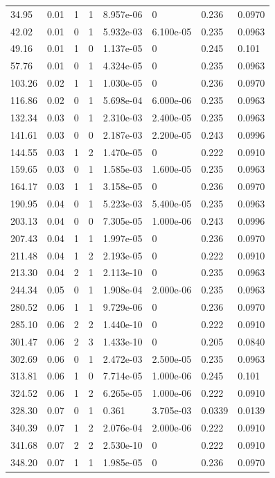 \documentclass[preview]{standalone}
\begin{document}
{{\begin{tabular}{L{1.2cm}C{1.2cm} C{0.3cm}C{0.5cm} C{1.4cm}C{1.4cm} C{1.4cm}C{1.4cm}}
  34.95  &  0.01  & 1     &  1 &  8.957e-06  & 0  & 0.236 &  0.0970   \\ 
  42.02  &  0.01  & 0     &  1 &  5.932e-03  & 6.100e-05  & 0.235 &  0.0963   \\ 
  49.16  &  0.01  & 1     &  0 &  1.137e-05  & 0  & 0.245 &  0.101   \\ 
  57.76  &  0.01  & 0     &  1 &  4.324e-05  & 0  & 0.235 &  0.0963   \\ 
  103.26  &  0.02  & 1     &  1 &  1.030e-05  & 0  & 0.236 &  0.0970   \\ 
  116.86  &  0.02  & 0     &  1 &  5.698e-04  & 6.000e-06  & 0.235 &  0.0963   \\ 
  132.34  &  0.03  & 0     &  1 &  2.310e-03  & 2.400e-05  & 0.235 &  0.0963   \\ 
  141.61  &  0.03  & 0     &  0 &  2.187e-03  & 2.200e-05  & 0.243 &  0.0996   \\ 
  144.55  &  0.03  & 1     &  2 &  1.470e-05  & 0  & 0.222 &  0.0910   \\ 
  159.65  &  0.03  & 0     &  1 &  1.585e-03  & 1.600e-05  & 0.235 &  0.0963   \\ 
  164.17  &  0.03  & 1     &  1 &  3.158e-05  & 0  & 0.236 &  0.0970   \\ 
  190.95  &  0.04  & 0     &  1 &  5.223e-03  & 5.400e-05  & 0.235 &  0.0963   \\ 
  203.13  &  0.04  & 0     &  0 &  7.305e-05  & 1.000e-06  & 0.243 &  0.0996   \\ 
  207.43  &  0.04  & 1     &  1 &  1.997e-05  & 0  & 0.236 &  0.0970   \\ 
  211.48  &  0.04  & 1     &  2 &  2.193e-05  & 0  & 0.222 &  0.0910   \\ 
  213.30  &  0.04  & 2     &  1 &  2.113e-10  & 0  & 0.235 &  0.0963   \\ 
  244.34  &  0.05  & 0     &  1 &  1.908e-04  & 2.000e-06  & 0.235 &  0.0963   \\ 
  280.52  &  0.06  & 1     &  1 &  9.729e-06  & 0  & 0.236 &  0.0970   \\ 
  285.10  &  0.06  & 2     &  2 &  1.440e-10  & 0  & 0.222 &  0.0910   \\ 
  301.47  &  0.06  & 2     &  3 &  1.433e-10  & 0  & 0.205 &  0.0840   \\ 
  302.69  &  0.06  & 0     &  1 &  2.472e-03  & 2.500e-05  & 0.235 &  0.0963   \\ 
  313.81  &  0.06  & 1     &  0 &  7.714e-05  & 1.000e-06  & 0.245 &  0.101   \\ 
  324.52  &  0.06  & 1     &  2 &  6.265e-05  & 1.000e-06  & 0.222 &  0.0910   \\ 
  328.30  &  0.07  & 0     &  1 &  0.361  & 3.705e-03  & 0.0339 &  0.0139   \\ 
  340.39  &  0.07  & 1     &  2 &  2.076e-04  & 2.000e-06  & 0.222 &  0.0910   \\ 
  341.68  &  0.07  & 2     &  2 &  2.530e-10  & 0  & 0.222 &  0.0910   \\ 
  348.20  &  0.07  & 1     &  1 &  1.985e-05  & 0  & 0.236 &  0.0970   \\ 
\hline 
\end{tabular} 

}}
\end{document}
